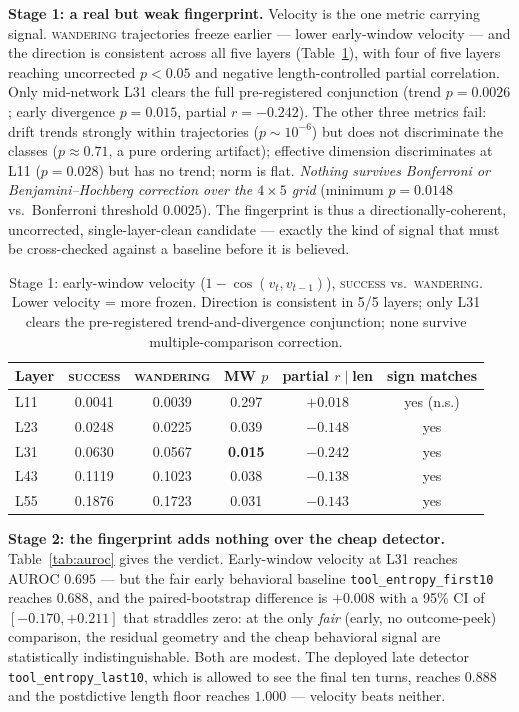 \documentclass[11pt]{article}
\begin{document}
\textbf{Stage 1: a real but weak fingerprint.} Velocity is the one metric carrying signal. \textsc{wandering} trajectories freeze earlier --- lower early-window velocity --- and the direction is consistent across all five layers (Table~\ref{tab:velocity}), with four of five layers reaching uncorrected $p<0.05$ and negative length-controlled partial correlation. Only mid-network L31 clears the full pre-registered conjunction (trend $p=0.0026$; early divergence $p=0.015$, partial $r=-0.242$). The other three metrics fail: drift trends strongly within trajectories ($p\sim10^{-6}$) but does not discriminate the classes ($p\approx0.71$, a pure ordering artifact); effective dimension discriminates at L11 ($p=0.028$) but has no trend; norm is flat. \emph{Nothing survives Bonferroni or Benjamini--Hochberg correction over the $4\times5$ grid} (minimum $p=0.0148$ vs.\ Bonferroni threshold $0.0025$). The fingerprint is thus a directionally-coherent, uncorrected, single-layer-clean candidate --- exactly the kind of signal that must be cross-checked against a baseline before it is believed.

\begin{table}[h]
\centering
\caption{Stage 1: early-window velocity ($1-\cos(v_t,v_{t-1})$), \textsc{success} vs.\ \textsc{wandering}. Lower velocity = more frozen. Direction is consistent in 5/5 layers; only L31 clears the pre-registered trend-and-divergence conjunction; none survive multiple-comparison correction.}
\label{tab:velocity}
\begin{tabular}{lccccc}
\toprule
Layer & \textsc{success} & \textsc{wandering} & MW $p$ & partial $r\mid$len & sign matches \\
\midrule
L11 & 0.0041 & 0.0039 & 0.297 & $+0.018$ & yes (n.s.) \\
L23 & 0.0248 & 0.0225 & 0.039 & $-0.148$ & yes \\
L31 & 0.0630 & 0.0567 & \textbf{0.015} & $-0.242$ & yes \\
L43 & 0.1119 & 0.1023 & 0.038 & $-0.138$ & yes \\
L55 & 0.1876 & 0.1723 & 0.031 & $-0.143$ & yes \\
\bottomrule
\end{tabular}
\end{table}

\textbf{Stage 2: the fingerprint adds nothing over the cheap detector.} Table~\ref{tab:auroc} gives the verdict. Early-window velocity at L31 reaches AUROC $0.695$ --- but the fair early behavioral baseline \texttt{tool\_entropy\_first10} reaches $0.688$, and the paired-bootstrap difference is $+0.008$ with a 95\% CI of $[-0.170,+0.211]$ that straddles zero: at the only \emph{fair} (early, no outcome-peek) comparison, the residual geometry and the cheap behavioral signal are statistically indistinguishable. Both are modest. The deployed late detector \texttt{tool\_entropy\_last10}, which is allowed to see the final ten turns, reaches $0.888$ and the postdictive length floor reaches $1.000$ --- velocity beats neither.
\end{document}
